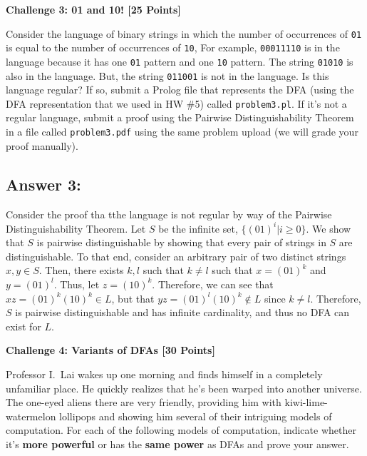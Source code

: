 \documentclass[12pt]{article}
\newcommand{\Problem}[3]{\mbox{} \newline \noindent \textbf{\textbf{Challenge #1: #2 [#3 Points] \\ }}}
\begin{document}
\Problem{3}{01 and 10!}{25}

Consider the language of binary strings in which the number of occurrences of \verb+01+ is equal to the number of occurrences of \verb+10+,  For example,
\verb+00011110+ is in the language because it has one \verb+01+ pattern and one \verb+10+ pattern.  The string \verb+01010+ is also in the language.  But, the string \verb+011001+ is not in the language.
Is this language regular?  If so, submit a Prolog file that represents the DFA (using the DFA representation that we used in HW \#5) called \verb+problem3.pl+.  If it's not a regular language, submit a proof using the Pairwise Distinguishability Theorem in a file called \verb+problem3.pdf+ using the same problem upload (we will grade your proof manually).
 
\subsection*{Answer 3:}
Consider the proof tha tthe language is not regular by way of the Pairwise Distinguishability Theorem. Let $S$ be the infinite set, $\{(01)^i| i \geq 0\}$. We show that $S$ is pairwise distinguishable by showing that
every pair of strings in $S$ are distinguishable. To that end, consider an arbitrary pair
of two distinct strings $x, y \in S$. Then, there exists $k,l$ such that $k \neq l$ such that $x = (01)^k$ and $y = (01)^l$. Thus, let $z = (10)^k$. Therefore, we can see that $xz = (01)^k(10)^k \in L$, but that $yz = (01)^l(10)^k \not \in L$ since $k \neq l$. Therefore, $S$ is pairwise distinguishable and has infinite cardinality, and thus no DFA
can exist for $L$. 

\Problem{4}{Variants of DFAs}{30}

Professor I.~Lai wakes up one morning and finds himself in a completely unfamiliar place.  He quickly realizes that he's been warped into another universe.  The one-eyed aliens there are very friendly, providing him with kiwi-lime-watermelon lollipops and showing him several of their intriguing models of computation.  For each of the following models of computation, indicate whether it's \textbf{more powerful} or has the \textbf{same power} as DFAs and prove your answer.  
	
\end{document}
